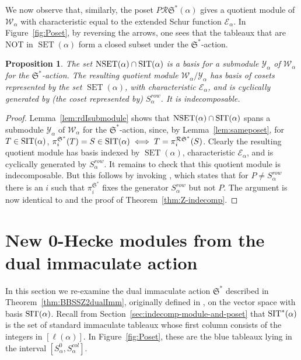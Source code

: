 \documentclass[12pt,letterpaper]{amsart}
\newtheorem{proposition}[theorem]{Proposition}
\theoremstyle{definition}
\newcommand{\dI}{\mathfrak{S}^*}
\newcommand{\rdI}{\mathcal{R}\mathfrak{S}^*}
\newcommand{\SET}{\ensuremath{\operatorname{SET}}} \newcommand{\NSET}{\ensuremath{\operatorname{NSET}}}\newcommand{\SRCT}{\ensuremath{\operatorname{SRCT}}}
\begin{document}
We now observe that, similarly, the poset $P\rdI(\alpha)$  gives a quotient module of  $\mathcal{W}_\alpha$ with characteristic equal to the extended Schur function $\mathcal{E}_\alpha$. In  Figure~\ref{fig:Poset}, by reversing the arrows, one sees that  the tableaux that are NOT in $\SET(\alpha)$ form a 
  closed subset under the $\dI$-action.
\begin{proposition}\label{prop:shin-module} The set $\NSET(\alpha)\cap\SIT(\alpha)$ is a basis for a submodule $\mathcal{Y}_\alpha$ of $\mathcal{W}_\alpha$ for the $\dI$-action.   The resulting quotient module 
$\mathcal{W}_\alpha/\mathcal{Y}_\alpha$ has basis of cosets represented by the set $\SET(\alpha)$, with characteristic $\mathcal{E}_\alpha$, and is cyclically generated by (the coset represented by) $S^{row}_\alpha$.  It  is indecomposable.
\end{proposition}
\begin{proof}
 Lemma~\ref{lem:rdIsubmodule} shows that $\NSET(\alpha)\cap\SIT(\alpha)$ spans a submodule $\mathcal{Y}_\alpha$ of $\mathcal{W}_\alpha$ for the $\dI$-action, since, by Lemma~\ref{lem:sameposet}, for $T\in \operatorname{SIT}(\alpha)$, $\pi_i^{\dI}(T)=S\in\SIT(\alpha)\iff T=\pi_i^{\rdI}(S)$. Clearly the resulting quotient module has basis 
 indexed by $\SET(\alpha)$, characteristic $\mathcal{E}_\alpha$, and is cyclically generated by $S^{row}_\alpha$.  It remains to check that this quotient module is indecomposable.   But this follows by invoking \cite[Lemma~3.11]{BBSSZ2014}, which states that for $P\ne  S^{row}_\alpha$ there is an $i$ such that 
$\pi_i^{\dI}$ fixes the generator $S^{row}_\alpha$ but not $P$. The argument is now identical to \cite[Theorem~3.12]{BBSSZ2014} and the proof of Theorem~\ref{thm:Z-indecomp}.
\end{proof}

\section{New 0-Hecke modules from the dual immaculate action}\label{sec:dualImmsubmodules}

In this section we re-examine the dual immaculate action $\dI$ described in  Theorem~\ref{thm:BBSSZ2dualImm}, originally defined in \cite{BBSSZ2015}, on the vector space with basis $\operatorname{SIT}(\alpha)$.  Recall from Section~\ref{sec:indecomp-module-and-poset} that $\operatorname{SIT}^*(\alpha)$ 
 is the set of standard immaculate tableaux whose first column consists of the integers in $[\ell(\alpha)]$. In Figure~\ref{fig:Poset}, these are the blue tableaux lying in the interval $[S^0_\alpha, S^{col}_\alpha]$.  
\end{document}
